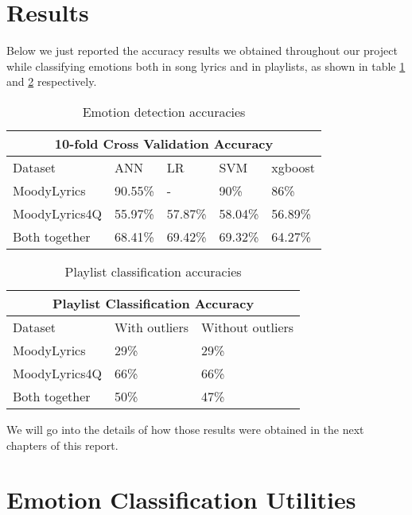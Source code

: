 \section{Results}

Below we just reported the accuracy results we obtained throughout our project while classifying emotions both in song lyrics and in playlists, as shown in table \ref{tab:compar} and \ref{tab:compar2} respectively.

\begin{table}[H]
\centering
\begin{tabular}{ |p{3cm}||p{1.5cm}|p{1.5cm}|p{1.5cm}|p{1.5cm}|  }
 \hline
 \multicolumn{5}{|c|}{10-fold Cross Validation Accuracy} \\
 \hline
 Dataset & ANN & LR &SVM & xgboost\\
 \hline
MoodyLyrics  & 90.55\%    &- &  90\% & 86\%\\
MoodyLyrics4Q  & 55.97\%    &57.87\% &  58.04\% & 56.89\%\\
Both together &   68.41\%  & 69.42\%   &69.32\% &64.27\%\\
\hline
\end{tabular}
\caption{Emotion detection accuracies} \label{tab:compar}
\end{table}

\begin{table}[H]
\centering
\begin{tabular}{ |p{3cm}||p{1.5cm}|p{1.5cm}| }
 \hline
 \multicolumn{3}{|c|}{Playlist Classification Accuracy} \\
 \hline
Dataset & With outliers & Without outliers\\
 \hline
MoodyLyrics & 29\% & 29\%\\
MoodyLyrics4Q  & 66\%    &66\%\\
Both together &   50\%  & 47\%\\
\hline
\end{tabular}
\caption{Playlist classification accuracies} \label{tab:compar2}
\end{table}

We will go into the details of how those results were obtained in the next chapters of this report.

\section{Emotion Classification Utilities}

